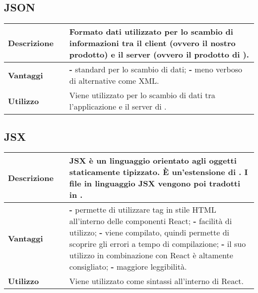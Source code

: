 \subsection{JSON}
\label{JSON}
\begin{table}[H]
	\centering
	\begin{tabular}{p{2cm}p{0.5cm}p{11.5cm}}
		\arrayrulecolor{lightgray}
		\toprule
		\textbf{Descrizione} & &
		Formato dati utilizzato per lo scambio di informazioni tra il client (ovvero il nostro prodotto) e il server (ovvero il prodotto di \riskapp).
		\\ \midrule
		\textbf{Vantaggi} & &
		\textbf{- } standard per lo scambio di dati;
		\newline
		\textbf{- } meno verboso di alternative come XML.
		\\ \midrule
		\textbf{Utilizzo} & &
		Viene utilizzato per lo scambio di dati tra l'applicazione \progetto e il server di \riskapp.
		\\ \bottomrule
	\end{tabular}
\end{table}



\newpage
\subsection{JSX}
\label{JSX}
\begin{table}[H]
	\centering
	\begin{tabular}{p{2cm}p{0.5cm}p{11.5cm}}
		\arrayrulecolor{lightgray}
		\toprule
		\textbf{Descrizione} & &
		JSX è un linguaggio orientato agli oggetti staticamente tipizzato. È un'estensione di \js.
		I file in linguaggio JSX vengono poi tradotti in \js.
		\\ \midrule
		\textbf{Vantaggi} & &
		\textbf{- }permette di utilizzare tag in stile HTML all'interno delle componenti React;
		\newline
		\textbf{- }facilità di utilizzo;
		\newline
		\textbf{- }viene compilato, quindi permette di scoprire gli errori a tempo di compilazione;
		\newline
		\textbf{- }il suo utilizzo in combinazione con React è altamente consigliato;
		\newline
		\textbf{- } maggiore leggibilità.
		\\ \midrule
		\textbf{Utilizzo} & &
		Viene utilizzato come sintassi all'interno di React.
		\\ \bottomrule
	\end{tabular}
\end{table}


